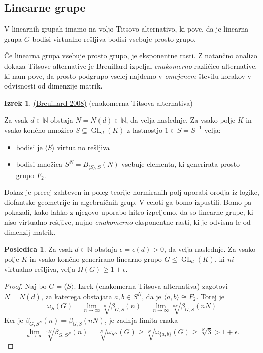 \documentclass[11pt]{book}
\def\NN{\mathbb{N}}
\DeclareMathOperator\GL{GL}
\theoremstyle{definition}
\theoremstyle{zgled}
\theoremstyle{odprtproblem}
\theoremstyle{domacanaloga}
\newenvironment{dokaz}
    {\color{siva}\begin{proof}}
    {\end{proof}}
\theoremstyle{izrek}
\newtheorem*{izrek}{Izrek}
\newtheorem*{posledica}{Posledica}
\begin{document}
\subsection{Linearne grupe}

V linearnih grupah imamo na voljo Titsovo alternativo, ki pove, da je linearna grupa $G$ bodisi virtualno rešljiva bodisi vsebuje prosto grupo. 

Če linearna grupa vsebuje prosto grupo, je eksponentne rasti. 
Z natančno analizo dokaza Titsove alternative je Breuillard izpeljal {\em enakomerno} različico alternative, ki nam pove, da prosto podgrupo vselej najdemo v {\em omejenem} številu korakov v odvisnosti od dimenzije matrik.

\begin{izrek}{\href{https://arxiv.org/abs/0804.1395}{(Breuillard 2008)}} {\sc (enakomerna Titsova alternativa)}

Za vsak $d \in \NN$ obstaja $N = N(d) \in \NN$, da velja naslednje. Za vsako polje $K$ in vsako končno množico $S \subseteq \GL_d(K)$ z lastnostjo $1 \in S = S^{-1}$ velja:
\vspace{-0.5\baselineskip}
\begin{itemize}[noitemsep]
\item bodisi je $\langle S \rangle$ virtualno rešljiva
\item bodisi množica $S^N = B_{\langle S \rangle,S}(N)$ vsebuje elementa, ki generirata prosto grupo $F_2$. \vspace{-\baselineskip}
\end{itemize}
\end{izrek}

Dokaz je precej zahteven in poleg teorije normiranih polj uporabi orodja iz logike, diofantske geometrije in algebraičnih grup. V celoti ga bomo izpustili. Bomo pa pokazali, kako lahko z njegovo uporabo hitro izpeljemo, da so linearne grupe, ki niso virtualno rešljive, nujno {\em enakomerno} eksponentne rasti, ki je odvisna le od dimenzij matrik.

\begin{posledica}
Za vsak $d \in \NN$ obstaja $\epsilon = \epsilon(d) > 0$, da velja naslednje. Za vsako polje $K$ in vsako končno generirano linearno grupo $G \leq \GL_d(K)$, ki {\em ni} virtualno rešljiva, velja $\Omega(G) \geq 1 + \epsilon$.
\end{posledica}

\begin{dokaz}
Naj bo $G =\langle S \rangle$. Izrek {\sc (enakomerna Titsova alternativa)} zagotovi $N = N(d)$, za katerega obstajata $a,b \in S^N$, da je $\langle a,b \rangle \cong F_2$. Torej je
\[
\omega_S(G) = \lim_{n \to \infty} \sqrt[n]{\beta_{G,S}(n)}
= \lim_{n \to \infty} \sqrt[nN]{\beta_{G,S}(nN)}
\]
Ker je $\beta_{G,S^N}(n) = \beta_{G,S}(nN)$, je zadnja limita enaka
\[
\lim_{n \to \infty} \sqrt[nN]{\beta_{G, S^N}(n)} =
\sqrt[N]{\omega_{S^N}(G)} 
\geq \sqrt[N]{\omega_{\{a,b \}}(G)} 
\geq \sqrt[N]{3} 
> 1+ \epsilon.
\]
\end{dokaz}
\end{document}
